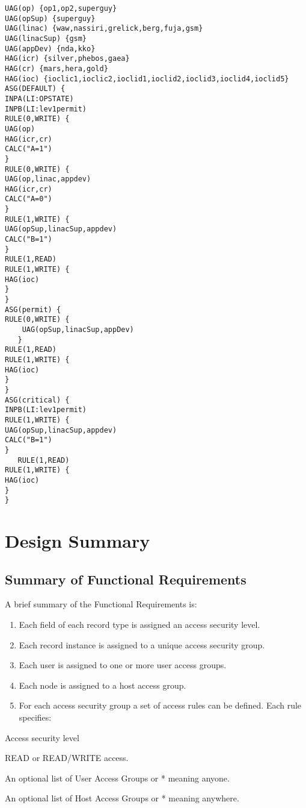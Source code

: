 \begin{verbatim}UAG(op) {op1,op2,superguy}
UAG(opSup) {superguy}
UAG(linac) {waw,nassiri,grelick,berg,fuja,gsm}
UAG(linacSup) {gsm}
UAG(appDev) {nda,kko}
HAG(icr) {silver,phebos,gaea}
HAG(cr) {mars,hera,gold}
HAG(ioc) {ioclic1,ioclic2,ioclid1,ioclid2,ioclid3,ioclid4,ioclid5}
ASG(DEFAULT) {
INPA(LI:OPSTATE)
INPB(LI:lev1permit)
RULE(0,WRITE) {
UAG(op)
HAG(icr,cr)
CALC("A=1")
}
RULE(0,WRITE) {
UAG(op,linac,appdev)
HAG(icr,cr)
CALC("A=0")
}
RULE(1,WRITE) {
UAG(opSup,linacSup,appdev)
CALC("B=1")
}
RULE(1,READ)
RULE(1,WRITE) {
HAG(ioc)
}
}
ASG(permit) {
RULE(0,WRITE) {
    UAG(opSup,linacSup,appDev)
   }
RULE(1,READ)
RULE(1,WRITE) {
HAG(ioc)
}
}
ASG(critical) {
INPB(LI:lev1permit)
RULE(1,WRITE) {
UAG(opSup,linacSup,appdev)
CALC("B=1")
}
   RULE(1,READ)
RULE(1,WRITE) {
HAG(ioc)
}
}
\end{verbatim}\section{Design Summary}

\subsection{Summary of Functional Requirements}

A brief summary of the Functional Requirements is:

\begin{enumerate}\item Each field of each record type is assigned an access security level.

\item Each record instance is assigned to a unique access security group.

\item Each user is assigned to one or more user access groups.

\item Each node is assigned to a host access group.

\item For each access security group a set of access rules can be defined. Each rule specifies: 

\end{enumerate}Access security level

READ or READ/WRITE access.

An optional list of User Access Groups or * meaning anyone.

An optional list of Host Access Groups or * meaning anywhere.

